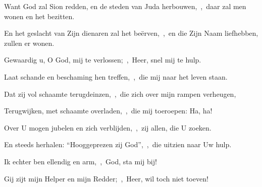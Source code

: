 \documentclass[12pt,twoside,a5paper]{article}
\begin{document}
\begin{halfparskip}
  Want God zal Sion redden, en de steden van Juda herbouwen,~\sep\ daar zal men wonen en het bezitten.

  En het geslacht van Zijn dienaren zal het beërven,~\sep\ en die Zijn Naam liefhebben, zullen er wonen.

   Gewaardig u, O God, mij te verlossen;~\sep\ Heer, snel mij te hulp.

  Laat schande en beschaming hen treffen,~\sep\ die mij naar het leven staan.

  Dat zij vol schaamte terugdeinzen,~\sep\ die zich over mijn rampen verheugen,

  Terugwijken, met schaamte overladen,~\sep\ die mij toeroepen: Ha, ha!

  Over U mogen jubelen en zich verblijden,~\sep\ zij allen, die U zoeken.

  En steeds herhalen: ``Hooggeprezen zij God'',~\sep\ die uitzien naar Uw hulp.

  Ik echter ben ellendig en arm,~\sep\ God, sta mij bij!

  Gij zijt mijn Helper en mijn Redder;~\sep\ Heer, wil toch niet toeven!
\end{halfparskip}
\end{document}
